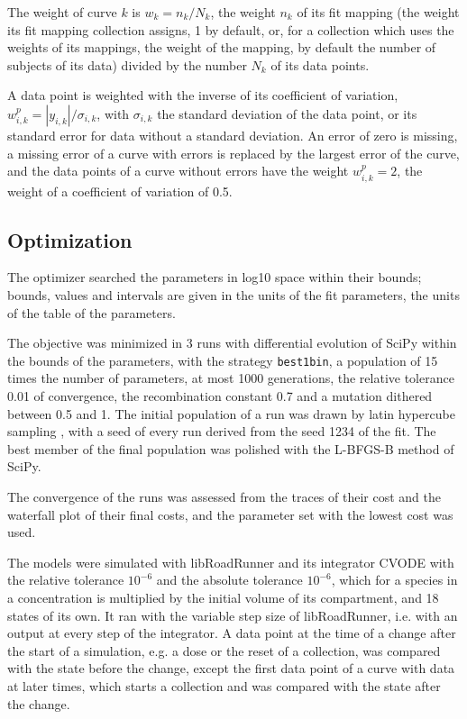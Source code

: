 The weight of curve $k$ is $w_k = n_k / N_k$, the weight $n_k$ of its fit mapping (the weight its fit mapping collection assigns, 1 by default, or, for a collection which uses the weights of its mappings, the weight of the mapping, by default the number of subjects of its data) divided by the number $N_k$ of its data points.

A data point is weighted with the inverse of its coefficient of variation, $w^{p}_{i,k} = |y_{i,k}| / \sigma_{i,k}$, with $\sigma_{i,k}$ the standard deviation of the data point, or its standard error for data without a standard deviation. An error of zero is missing, a missing error of a curve with errors is replaced by the largest error of the curve, and the data points of a curve without errors have the weight $w^{p}_{i,k} = 2$, the weight of a coefficient of variation of 0.5.

\subsection{Optimization}

The optimizer searched the parameters in log10 space within their bounds; bounds, values and intervals are given in the units of the fit parameters, the units of the table of the parameters.

The objective was minimized in 3 runs with differential evolution \cite{Storn1997} of SciPy \cite{Virtanen2020} within the bounds of the parameters, with the strategy \texttt{best1bin}, a population of 15 times the number of parameters, at most 1000 generations, the relative tolerance 0.01 of convergence, the recombination constant 0.7 and a mutation dithered between 0.5 and 1. The initial population of a run was drawn by latin hypercube sampling \cite{McKay1979}, with a seed of every run derived from the seed 1234 of the fit. The best member of the final population was polished with the L-BFGS-B method of SciPy.

The convergence of the runs was assessed from the traces of their cost and the waterfall plot of their final costs, and the parameter set with the lowest cost was used.

The models were simulated with libRoadRunner \cite{Welsh2023} and its integrator CVODE \cite{Hindmarsh2005} with the relative tolerance $10^{-6}$ and the absolute tolerance $10^{-6}$, which for a species in a concentration is multiplied by the initial volume of its compartment, and 18 states of its own. It ran with the variable step size of libRoadRunner, i.e. with an output at every step of the integrator. A data point at the time of a change after the start of a simulation, e.g. a dose or the reset of a collection, was compared with the state before the change, except the first data point of a curve with data at later times, which starts a collection and was compared with the state after the change.

